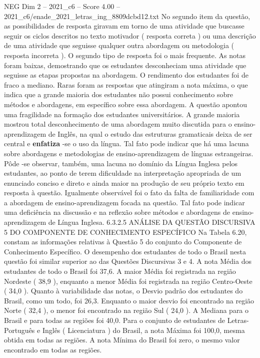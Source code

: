 \begin{textsample}{NEG Dim 2 – 2021\_c6 – Score 4.00 – 2021\_c6/enade\_2021\_letras\_ing\_8809dcbd12.txt}
No segundo item da questão, as possibilidades de resposta giravam em torno de uma atividade que buscasse seguir os ciclos descritos no texto motivador ( resposta correta ) ou uma descrição de uma atividade que seguisse qualquer outra abordagem ou metodologia ( resposta incorreta ).
O segundo tipo de resposta foi o mais frequente.
As notas foram baixas, demostrando que os estudantes desconheciam uma atividade que seguisse as etapas propostas na abordagem.
O rendimento dos estudantes foi de fraco a mediano.
Raras foram as respostas que atingiram a nota máxima, o que indica que a grande maioria dos estudantes não possui conhecimento sobre métodos e abordagens, em específico sobre essa abordagem.
A questão apontou uma fragilidade na formação dos estudantes universitários.
A grande maioria mostrou total desconhecimento de uma abordagem muito discutida para o ensino-aprendizagem de Inglês, na qual o estudo das estruturas gramaticais deixa de ser central e \textbf{enfatiza} -se o uso da língua.
Tal fato pode indicar que há uma lacuna sobre abordagens e metodologias de ensino-aprendizagem de línguas estrangeiras.
Pôde -se observar, também, uma lacuna no domínio da Língua Inglesa pelos estudantes, ao ponto de terem dificuldade na interpretação apropriada de um enunciado conciso e direto e ainda maior na produção de seu próprio texto em resposta à questão.
Igualmente observável foi o fato da falta de familiaridade com a abordagem de ensino-aprendizagem focada na questão.
Tal fato pode indicar uma deficiência na discussão e na reflexão sobre métodos e abordagens de ensino-aprendizagem de Língua Inglesa. 6.3.2.5 ANÁLISE DA QUESTÃO DISCURSIVA 5 DO COMPONENTE DE CONHECIMENTO ESPECÍFICO Na Tabela 6.20, constam as informações relativas à Questão 5 do conjunto do Componente de Conhecimento Específico.
O desempenho dos estudantes de todo o Brasil nesta questão foi similar superior ao das Questões Discursivas 3 e 4.
A nota Média dos estudantes de todo o Brasil foi 37,6.
A maior Média foi registrada na região Nordeste ( 38,9 ), enquanto a menor Média foi registrada na região Centro-Oeste ( 34,0 ).
Quanto à variabilidade das notas, o Desvio padrão dos estudantes do Brasil, como um todo, foi 26,3.
Enquanto o maior desvio foi encontrado na região Norte ( 32,4 ), o menor foi encontrado na região Sul ( 24,0 ).
A Mediana para o Brasil e para todas as regiões foi 40,0.
Para o conjunto de estudantes de Letras-Português e Inglês ( Licenciatura ) do Brasil, a nota Máxima foi 100,0, mesma obtida em todas as regiões.
A nota Mínima do Brasil foi zero, o mesmo valor encontrado em todas as regiões.

\end{textsample}
